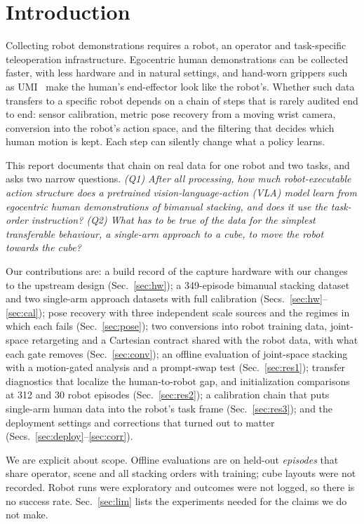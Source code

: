 \documentclass[conference,10pt]{IEEEtran}
\begin{document}
\section{Introduction}\label{sec:intro}
Collecting robot demonstrations requires a robot, an operator and task-specific teleoperation infrastructure. Egocentric
human demonstrations can be collected faster, with less hardware and in natural settings, and hand-worn grippers such as
UMI~\cite{chi2024umi} make the human's end-effector look like the robot's. Whether such data transfers to a specific robot
depends on a chain of steps that is rarely audited end to end: sensor calibration, metric pose recovery from a moving wrist
camera, conversion into the robot's action space, and the filtering that decides which human motion is kept. Each step can
silently change what a policy learns.

This report documents that chain on real data for one robot and two tasks, and asks two narrow questions. \emph{(Q1) After
all processing, how much robot-executable action structure does a pretrained vision-language-action (VLA) model learn from
egocentric human demonstrations of bimanual stacking, and does it use the task-order instruction? (Q2) What has to be true of
the data for the simplest transferable behaviour, a single-arm approach to a cube, to move the robot towards the cube?}

Our contributions are: a build record of the capture hardware with our changes to the upstream design (Sec.~\ref{sec:hw});
a 349-episode bimanual stacking dataset and two single-arm approach datasets with full calibration (Secs.~\ref{sec:hw}--\ref{sec:cal});
pose recovery with three independent scale sources and the regimes in which each fails (Sec.~\ref{sec:pose}); two
conversions into robot training data, joint-space retargeting and a Cartesian contract shared with the robot data, with
what each gate removes (Sec.~\ref{sec:conv}); an offline evaluation of joint-space stacking with a motion-gated analysis and a
prompt-swap test (Sec.~\ref{sec:res1}); transfer diagnostics that localize the human-to-robot gap, and initialization
comparisons at 312 and 30 robot episodes (Sec.~\ref{sec:res2}); a calibration chain that puts single-arm human data into the
robot's task frame (Sec.~\ref{sec:res3}); and the deployment settings and corrections that turned out to matter
(Secs.~\ref{sec:deploy}--\ref{sec:corr}).

We are explicit about scope. Offline evaluations are on held-out \emph{episodes} that share operator, scene and all stacking
orders with training; cube layouts were not recorded. Robot runs were exploratory and outcomes were not logged, so there is
no success rate. Sec.~\ref{sec:lim} lists the experiments needed for the claims we do not make.
\end{document}
